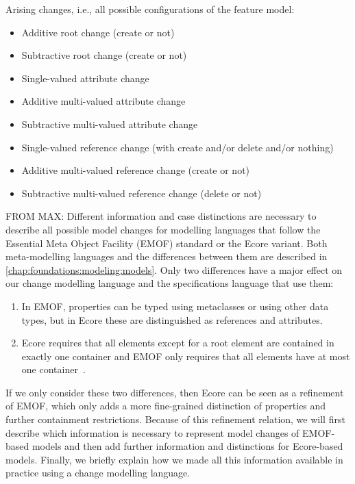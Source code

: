 Arising changes, i.e., all possible configurations of the feature model:
\begin{itemize}
    \item Additive root change (create or not)
    \item Subtractive root change (create or not)
    \item Single-valued attribute change
    \item Additive multi-valued attribute change
    \item Subtractive multi-valued attribute change
    \item Single-valued reference change (with create and/or delete and/or nothing)
    \item Additive multi-valued reference change (create or not)
    \item Subtractive multi-valued reference change (delete or not)
\end{itemize}



FROM MAX:
Different information and case distinctions are necessary to describe all possible model changes for modelling languages that follow the Essential Meta Object Facility (EMOF) standard or the Ecore variant. 
Both meta-modelling languages and the differences between them are described in \autoref{chap:foundations:modeling:models}.
Only two differences have a major effect on our change modelling language and the specifications language that use them:
\begin{enumerate}%
\item In EMOF, properties can be typed using metaclasses or using other data types, but in Ecore these are distinguished as references and attributes.
\item Ecore requires that all elements except for a root element are contained in exactly one container and EMOF only requires that all elements have at most one container~\cite[pp.\ 31-32]{mof}.
\end{enumerate}
If we only consider these two differences, then Ecore can be seen as a refinement of EMOF, which only adds a more fine-grained distinction of properties and further containment restrictions.
Because of this refinement relation, we will first describe which information is necessary to represent model changes of EMOF-based models and then add further information and distinctions for Ecore-based models.
Finally, we briefly explain how we made all this information available in practice using a change modelling language.

